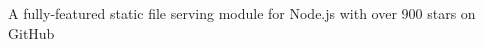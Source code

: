 \begin{project}

  \begin{projectdescription}
    A fully-featured static file serving module for Node.js with over 900 stars
    on GitHub
  \end{projectdescription}
\end{project}

